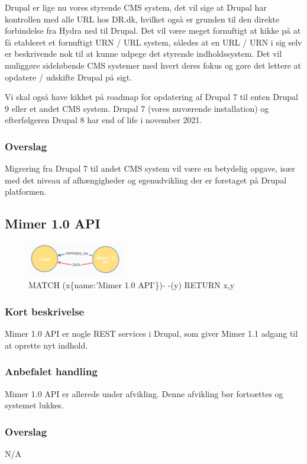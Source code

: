 \documentclass{article}
\begin{document}
Drupal er lige nu vores styrende CMS system, det vil sige at Drupal har kontrollen med alle URL hos DR.dk, hvilket også er grunden til den direkte forbindelse fra Hydra ned til Drupal. Det vil være meget fornuftigt at kikke på at få etableret et fornuftigt URN / URL system, således at en URL / URN i sig selv er beskrivende nok til at kunne udpege det styrende indholdssystem. Det vil muliggøre sideløbende CMS systemer med hvert deres fokus og gøre det lettere at opdatere / udskifte Drupal på sigt.
 
Vi skal også have kikket på roadmap for opdatering af Drupal 7 til enten Drupal 9 eller et andet CMS system. Drupal 7 (vores nuværende installation) og efterfølgeren Drupal 8 har end of life i november 2021.
\subsubsection{Overslag}
Migrering fra Drupal 7 til andet CMS system vil være en betydelig opgave, især med det niveau af afhængigheder og egenudvikling der er foretaget på Drupal platformen. 


\subsection{Mimer 1.0 API}
\begin{figure}[h]
\includegraphics[width=120pt]{MimerAPI.PNG}
\caption{MATCH (x\{name:'Mimer 1.0 API'\})- -(y) RETURN x,y}
\end{figure}
\subsubsection{Kort beskrivelse}
Mimer 1.0 API er nogle REST services i Drupal, som giver Mimer 1.1 adgang til at oprette nyt indhold.
\subsubsection{Anbefalet handling}
Mimer 1.0 API er allerede under afvikling. Denne afvikling bør fortsættes og systemet lukkes.
\subsubsection{Overslag}
N/A
\end{document}
